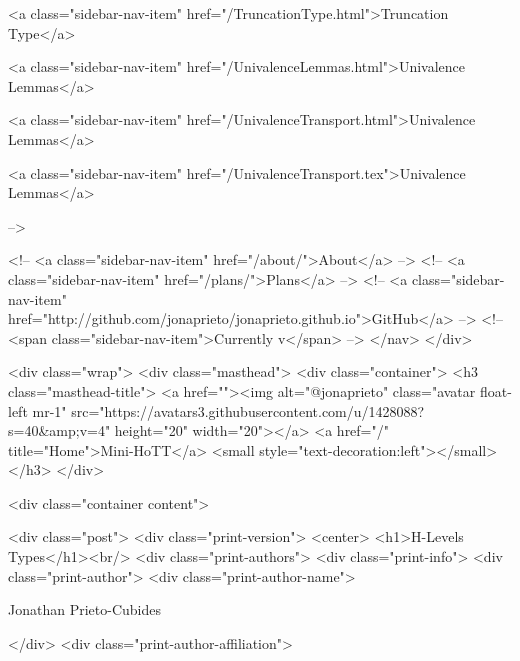       
    
      
        
          <a class="sidebar-nav-item" href="/TruncationType.html">Truncation Type</a>
        
      
    
      
        
          <a class="sidebar-nav-item" href="/UnivalenceLemmas.html">Univalence Lemmas</a>
        
      
    
      
        
          <a class="sidebar-nav-item" href="/UnivalenceTransport.html">Univalence Lemmas</a>
        
      
    
      
        
          <a class="sidebar-nav-item" href="/UnivalenceTransport.tex">Univalence Lemmas</a>
        
      
     -->

    <!-- <a class="sidebar-nav-item" href="/about/">About</a> -->
    <!-- <a class="sidebar-nav-item" href="/plans/">Plans</a> -->
    <!-- <a class="sidebar-nav-item" href="http://github.com/jonaprieto/jonaprieto.github.io">GitHub</a> -->
    <!-- <span class="sidebar-nav-item">Currently v</span> -->
  </nav>
</div>

    <div class="wrap">
      <div class="masthead">
        <div class="container">
          <h3 class="masthead-title">
            <a href=""><img alt="@jonaprieto" class="avatar float-left mr-1" src="https://avatars3.githubusercontent.com/u/1428088?s=40&amp;v=4" height="20" width="20"></a>
            <a href="/" title="Home">Mini-HoTT</a>
            <small style="text-decoration:left"></small>
          </h3>
        </div>
      
      <div class="container content">
        







<div class="post">
  <div class="print-version">
    <center>
      <h1>H-Levels Types</h1><br/>
        <div class="print-authors">
          <div class="print-info">
            <div class="print-author">
              <div class="print-author-name">
                
                  Jonathan Prieto-Cubides
                
              </div>
              <div class="print-author-affiliation">
                
